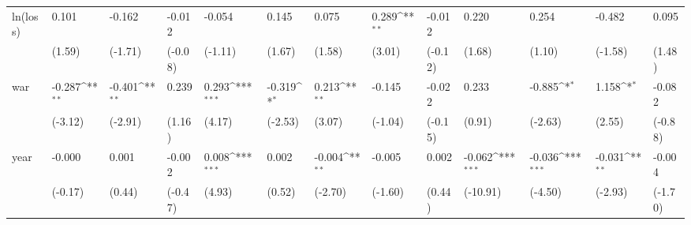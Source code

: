 \def\sym#1{\ifmmode^{#1}\else\(^{#1}\)\fi}
\begin{tabular}{p{1.5cm} p{1.7cm} p{1.7cm} p{1.7cm} p{1.7cm} p{1.7cm} p{1.7cm} p{1.7cm} p{1.7cm} p{1.7cm} p{1.7cm} p{1.7cm} p{1.7cm}}
\hline
ln(loss)        &    0.101         &   -0.162         &   -0.012         &   -0.054         &    0.145         &    0.075         &    0.289\sym{**} &   -0.012         &    0.220         &    0.254         &   -0.482         &    0.095         \\
                &   (1.59)         &  (-1.71)         &  (-0.08)         &  (-1.11)         &   (1.67)         &   (1.58)         &   (3.01)         &  (-0.12)         &   (1.68)         &   (1.10)         &  (-1.58)         &   (1.48)         \\
war             &   -0.287\sym{**} &   -0.401\sym{**} &    0.239         &    0.293\sym{***}&   -0.319\sym{*}  &    0.213\sym{**} &   -0.145         &   -0.022         &    0.233         &   -0.885\sym{*}  &    1.158\sym{*}  &   -0.082         \\
                &  (-3.12)         &  (-2.91)         &   (1.16)         &   (4.17)         &  (-2.53)         &   (3.07)         &  (-1.04)         &  (-0.15)         &   (0.91)         &  (-2.63)         &   (2.55)         &  (-0.88)         \\
year            &   -0.000         &    0.001         &   -0.002         &    0.008\sym{***}&    0.002         &   -0.004\sym{**} &   -0.005         &    0.002         &   -0.062\sym{***}&   -0.036\sym{***}&   -0.031\sym{**} &   -0.004         \\
                &  (-0.17)         &   (0.44)         &  (-0.47)         &   (4.93)         &   (0.52)         &  (-2.70)         &  (-1.60)         &   (0.44)         & (-10.91)         &  (-4.50)         &  (-2.93)         &  (-1.70)         \\
\end{tabular}
\def\sym#1{\ifmmode^{#1}\else\(^{#1}\)\fi}
